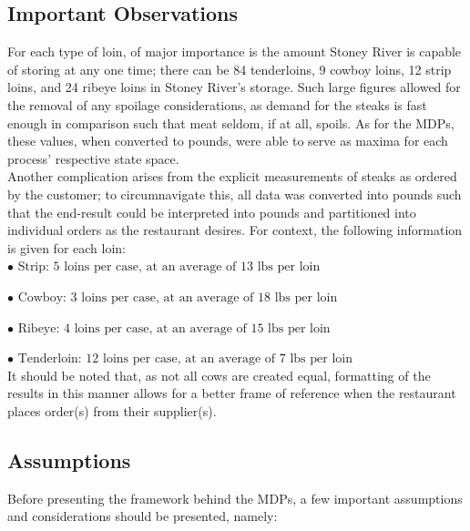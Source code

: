 \documentclass[12pt,a4paper]{article}
\begin{document}
\subsection{Important Observations}

For each type of loin, of major importance is the amount Stoney River is capable of storing at any one time; there can be 84 tenderloins, 9 cowboy loins, 12 strip loins, and 24 ribeye loins in Stoney River's storage. Such large figures allowed for the removal of any spoilage considerations, as demand for the steaks is fast enough in comparison such that meat seldom, if at all, spoils. As for the MDPs, these values, when converted to pounds, were able to serve as maxima for each process' respective state space. 
\\

Another complication arises from the explicit measurements of steaks as ordered by the customer; to circumnavigate this, all data was converted into pounds such that the end-result could be interpreted into pounds and partitioned into individual orders as the restaurant desires. For context, the following information is given for each loin:
\\

$ \bullet \text{ Strip: 5 loins per case, at an average of 13 lbs per loin}  $

$ \bullet \text{ Cowboy: 3 loins per case, at an average of 18 lbs per loin}  $

$ \bullet \text{ Ribeye: 4 loins per case, at an average of 15 lbs per loin}  $

$ \bullet \text{ Tenderloin: 12 loins per case, at an average of 7 lbs per loin}  $
\\

It should be noted that, as not all cows are created equal, formatting of the results in this manner allows for a better frame of reference when the restaurant places order(s) from their supplier(s).

\subsection{Assumptions}

Before presenting the framework behind the MDPs, a few important assumptions and considerations should be presented, namely:
\end{document}
